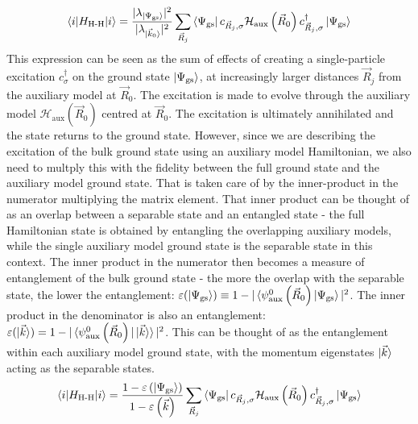 \documentclass{report}
\numberwithin{equation}{section}
\begin{document}
\begin{equation}\begin{aligned}
	\braket{i | H_\text{H-H} | i} = \frac{|\lambda_{\ket{\Psi_\text{gs}}}|^2}{|\lambda_{\ket{\vec k_0}}|^2}\sum_{\vec R_j} \bra{\Psi_\text{gs}} c_{\vec R_j,\sigma}\mathcal{H}_\text{aux}\left( \vec R_0 \right)c^\dagger_{\vec R_j,\sigma}\ket{\Psi_\text{gs}}
\end{aligned}\end{equation}
This expression can be seen as the sum of effects of creating a single-particle excitation \(c^\dagger_\sigma\) on the ground state \(\ket{\Psi_\text{gs} }\), at increasingly larger distances \(\vec R_j\) from the auxiliary model at \(\vec R_0\). The excitation is made to evolve through the auxiliary model \(\mathcal{H}_\text{aux}\left( \vec R_0 \right) \) centred at \(\vec R_0\). The excitation is ultimately annihilated and the state returns to the ground state. However, since we are describing the excitation of the bulk ground state using an auxiliary model Hamiltonian, we also need to multply this with the fidelity between the full ground state and the auxiliary model ground state. That is taken care of by the inner-product in the numerator multiplying the matrix element. That inner product can be thought of as an overlap between a separable state and an entangled state - the full Hamiltonian state is obtained by entangling the overlapping auxiliary models, while the single auxiliary model ground state is the separable state in this context. The inner product in the numerator then becomes a measure of entanglement of the bulk ground state - the more the overlap with the separable state, the lower the entanglement: \(\varepsilon(\ket{\Psi_\text{gs}}) \equiv 1 - |\braket{\psi^0_\text{aux}\left(\vec R_0\right) | \Psi_\text{gs}}|^2 \). The inner product in the denominator is also an entanglement: \(\varepsilon( \ket{\vec k}) = 1 - |\braket{\psi^0_\text{aux}\left(\vec R_0\right) | \ket{\vec k}}|^2\). This can be thought of as the entanglement within each auxiliary model ground state, with the momentum eigenstates \(\ket{\vec k}\) acting as the separable states.
\begin{equation}\begin{aligned}
	\braket{i | H_\text{H-H} | i} = \frac{1 - \varepsilon\left( \ket{\Psi_\text{gs}}\right)}{1 - \varepsilon\left( \vec k\right)}\sum_{\vec R_j} \bra{\Psi_\text{gs}} c_{\vec R_j,\sigma}\mathcal{H}_\text{aux}\left( \vec R_0 \right)c^\dagger_{\vec R_j,\sigma}\ket{\Psi_\text{gs}}
\end{aligned}\end{equation}
\end{document}
